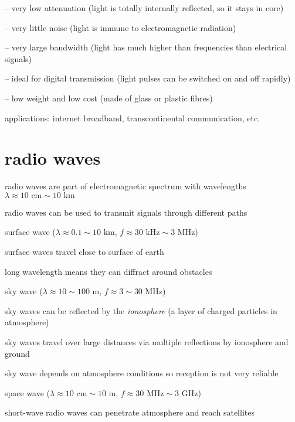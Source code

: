 \begin{compactitem}
	\item[--] very low attenuation (light is totally internally reflected, so it stays in core)
	
	\item[--] very little noise (light is immune to electromagnetic radiation)
	
	\item[--] very large bandwidth (light has much higher than frequencies than electrical signals)
	
	\item[--] ideal for digital transmission (light pulses can be switched on and off rapidly)
	
	\item[--] low weight and low cost (made of glass or plastic fibres)
\end{compactitem}

\cmt applications: internet broadband, transcontinental communication, etc.

\section{radio waves}

radio waves are part of electromagnetic spectrum with wavelengths $\lambda \approx 10\text{ cm} \sim 10 \text{ km}$

radio waves can be used to transmit signals through different paths

\cmt surface wave ($\lambda \approx 0.1 \sim 10 \text{ km}$, $f\approx 30 \text{ kHz} \sim 3 \text{ MHz}$)

surface waves travel close to surface of earth

long wavelength means they can diffract around obstacles

\cmt sky wave ($\lambda \approx 10 \sim 100 \text{ m}$, $f\approx 3 \sim 30 \text{ MHz}$)

sky waves can be reflected by the \emph{ionosphere} (a layer of charged particles in atmosphere)

sky waves travel over large distances via multiple reflections by ionosphere and ground

sky wave depends on atmosphere conditions so reception is not very reliable

\cmt space wave ($\lambda \approx 10\text{ cm} \sim 10 \text{ m}$, $f\approx 30 \text{ MHz} \sim 3 \text{ GHz} $)

short-wave radio waves can penetrate atmosphere and reach satellites

